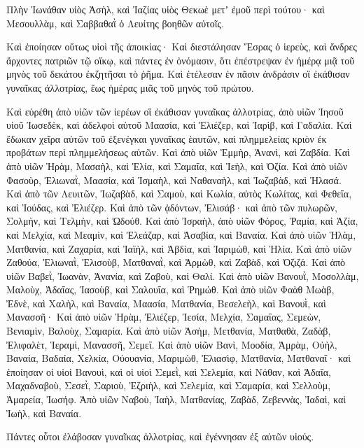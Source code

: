 {Πλὴν Ἰωνάθαν υἱὸς Ἀσὴλ, καὶ Ἰαζίας υἱὸς Θεκωὲ μετʼ ἐμοῦ περὶ τούτου· καὶ Μεσουλλὰμ, καὶ Σαββαθαῒ ὁ Λευίτης βοηθῶν αὐτοῖς.
\par }{\PP {}Καὶ ἐποίησαν οὕτως υἱοὶ τῆς ἀποικίας· Καὶ διεστάλησαν Ἔσρας ὁ ἱερεὺς, καὶ ἄνδρες ἄρχοντες πατριῶν τῷ οἴκῳ, καὶ πάντες ἐν ὀνόμασιν, ὅτι ἐπέστρεψαν ἐν ἡμέρᾳ μιᾷ τοῦ μηνὸς τοῦ δεκάτου ἐκζητῆσαι τὸ ῥῆμα.
Καὶ ἐτέλεσαν ἐν πᾶσιν ἀνδράσιν οἳ ἐκάθισαν γυναῖκας ἀλλοτρίας, ἕως ἡμέρας μιᾶς τοῦ μηνὸς τοῦ πρώτου.
\par }{\PP {}Καὶ εὑρέθη ἀπὸ υἱῶν τῶν ἱερέων οἳ ἐκάθισαν γυναῖκας ἀλλοτρίας, ἀπὸ υἱῶν Ἰησοῦ υἱοῦ Ἰωσεδὲκ, καὶ ἀδελφοὶ αὐτοῦ Μαασία, καὶ Ἐλιέζερ, καὶ Ἰαρὶβ, καὶ Γαδαλία.
Καὶ ἔδωκαν χεῖρα αὐτῶν τοῦ ἐξενέγκαι γυναῖκας ἑαυτῶν, καὶ πλημμελείας κριὸν ἐκ προβάτων περὶ πλημμελήσεως αὐτῶν.
Καὶ ἀπὸ υἱῶν Ἐμμὴρ, Ἀνανὶ, καὶ Ζαβδία.
Καὶ ἀπὸ υἱῶν Ἠρὰμ, Μασαὴλ, καὶ Ἐλία, καὶ Σαμαΐα, καὶ Ἰεὴλ, καὶ Ὀζία.
Καὶ ἀπὸ υἱῶν Φασοὺρ, Ἐλιωναῒ, Μαασία, καὶ Ἰσμαὴλ, καὶ Ναθαναὴλ, καὶ Ἰωζαβὰδ, καὶ Ἠλασά.
Καὶ ἀπὸ τῶν Λευιτῶν, Ἰωζαβὰδ, καὶ Σαμοὺ, καὶ Κωλία, αὐτὸς Κωλίτας, καὶ Φεθεΐα, καὶ Ἰούδας, καὶ Ἐλιέζερ.
Καὶ ἀπὸ τῶν ᾀδόντων, Ἐλισάβ· καὶ ἀπὸ τῶν πυλωρῶν, Σολμὴν, καὶ Τελμὴν, καὶ Ὠδούθ.
Καὶ ἀπὸ Ἰσραὴλ, ἀπὸ υἱῶν Φόρος, Ῥαμία, καὶ Ἀζία, καὶ Μελχία, καὶ Μεαμὶν, καὶ Ἐλεάζαρ, καὶ Ἀσαβία, καὶ Βαναία.
Καὶ ἀπὸ υἱῶν Ἡλὰμ, Ματθανία, καὶ Ζαχαρία, καὶ Ἰαϊὴλ, καὶ Ἀβδία, καὶ Ἰαριμὼθ, καὶ Ἠλία.
Καὶ ἀπὸ υἱῶν Ζαθούα, Ἐλιωναῒ, Ἐλισοὺβ, Ματθαναῒ, καὶ Ἀρμὼθ, καὶ Ζαβὰδ, καὶ Ὀζιζά.
Καὶ ἀπὸ υἱῶν Βαβεῒ, Ἰωανὰν, Ἀνανία, καὶ Ζαβοὺ, καὶ Θαλί.
Καὶ ἀπὸ υἱῶν Βανουῒ, Μοσολλὰμ, Μαλοὺχ, Ἀδαΐας, Ἰασοὺβ, καὶ Σαλουΐα, καὶ Ῥημώθ.
Καὶ ἀπὸ υἱῶν Φαὰθ Μωὰβ, Ἐδνὲ, καὶ Χαλὴλ, καὶ Βαναία, Μαασία, Ματθανία, Βεσελεὴλ, καὶ Βανουῒ, καὶ Μανασσῆ·
Καὶ ἀπὸ υἱῶν Ἠρὰμ, Ἐλιέζερ, Ἰεσία, Μελχία, Σαμαΐας, Σεμεὼν,
Βενιαμὶν, Βαλοὺχ, Σαμαρία.
Καὶ ἀπὸ υἱῶν Ἀσὴμ, Μετθανία, Ματθαθὰ, Ζαδὰβ, Ἐλιφαλὲτ, Ἱεραμὶ, Μανασσῆ, Σεμεΐ.
Καὶ ἀπὸ υἱῶν Βανὶ, Μοοδία, Ἀμρὰμ, Οὐὴλ,
Βαναία, Βαδαία, Χελκία,
Οὐουανία, Μαριμὼθ, Ἐλιασὶφ,
Ματθανία, Ματθαναΐ· καὶ ἐποίησαν
οἱ υἱοἱ Βανουὶ, καὶ οἱ υἱοὶ Σεμεῒ,
καὶ Σελεμία, καὶ Νάθαν, καὶ Ἀδαΐα,
Μαχαδναβοὺ, Σεσεῒ, Σαριοὺ,
Ἐζριὴλ, καὶ Σελεμία, καὶ Σαμαρία,
καὶ Σελλοὺμ, Ἀμαρεία, Ἰωσήφ.
Ἀπὸ υἱῶν Ναβοὺ, Ἰαὴλ, Ματθανίας, Ζαβὰδ, Ζεβεννὰς, Ἰαδαὶ, καὶ Ἰωὴλ, καὶ Βαναία.
\par }{\PP {}Πάντες οὗτοι ἐλάβοσαν γυναῖκας ἀλλοτρίας, καὶ ἐγέννησαν ἐξ αὐτῶν υἱούς.
\par }